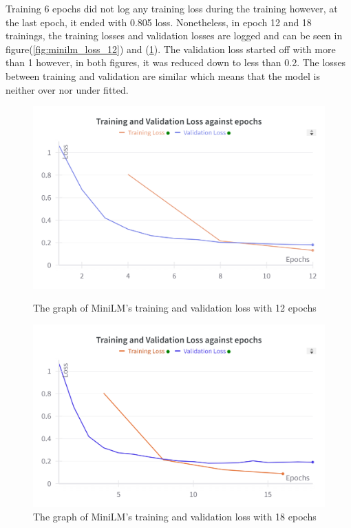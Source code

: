 Training 6 epochs did not log any training loss during the training however, at the last epoch, it ended with 0.805 loss. Nonetheless, in epoch 12 and 18 trainings, the training losses and validation losses are logged and can be seen in figure(\ref{fig:minilm_loss_12}) and (\ref{fig:minilm_loss_18}). The validation loss started off with more than 1 however, in both figures, it was reduced down to less than 0.2. The losses between training and validation are similar which means that the model is neither over nor under fitted.\bigskip
    
\begin{figure}[h!]
\centering
\begin{minipage}{.5\textwidth}
    \centering
    \includegraphics[width=1\linewidth]{Figures/minilm_12_epochs.png}
    \caption{The graph of MiniLM's training and validation loss with 12 epochs}
    \label{fig:minilm_loss_12}
\end{minipage}%
\begin{minipage}{.5\textwidth}
    \centering
    \includegraphics[width=1\linewidth]{Figures/minilm_18_epochs.png}
    \caption{The graph of MiniLM's training and validation loss with 18 epochs}
    \label{fig:minilm_loss_18}
\end{minipage}
\end{figure}

